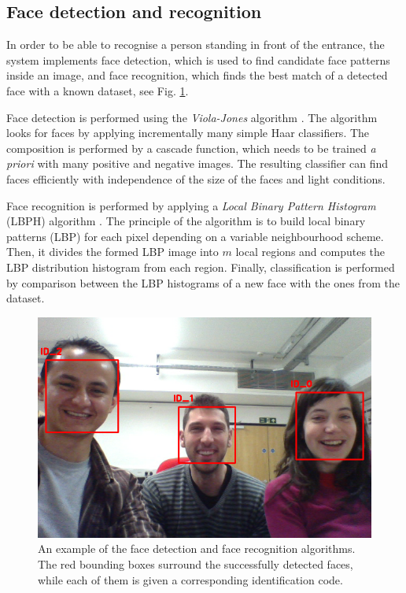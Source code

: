 \documentclass[conference]{IEEEtran}
\begin{document}
\subsection{\label{sec:vision}Face detection and recognition}
In order to be able to recognise a person standing in front of the entrance, the system implements face detection, which is used to find candidate face patterns inside an image, and face recognition, which finds the best match of a detected face with a known dataset, see Fig. \ref{fig:face}.

Face detection is performed using the \textit{Viola-Jones} algorithm \cite{Viola01_RapidObjDet}. The algorithm looks for faces by applying incrementally many simple Haar classifiers. The composition is performed by a cascade function, which needs to be trained \textit{a priori} with many positive and negative images. The resulting classifier can find faces efficiently with independence of the size of the faces and light conditions.

Face recognition is performed by applying a \textit{Local Binary Pattern Histogram} (LBPH) algorithm \cite{Ahonen04_FaceRecLBP}. The principle of the algorithm is to build local binary patterns (LBP) for each pixel depending on a variable neighbourhood scheme. Then, it divides the formed LBP image into $m$ local regions and computes the LBP distribution histogram from each region. Finally, classification is performed by comparison between the LBP histograms of a new face with the ones from the dataset.

\begin{figure}[!t]
\centering
\includegraphics[width=3.in]{BARC_FaceRec.png}
\caption{An example of the face detection and face recognition algorithms. The red bounding boxes surround the successfully detected faces, while each of them is given a corresponding identification code.}
\label{fig:face}
\end{figure}
\end{document}
